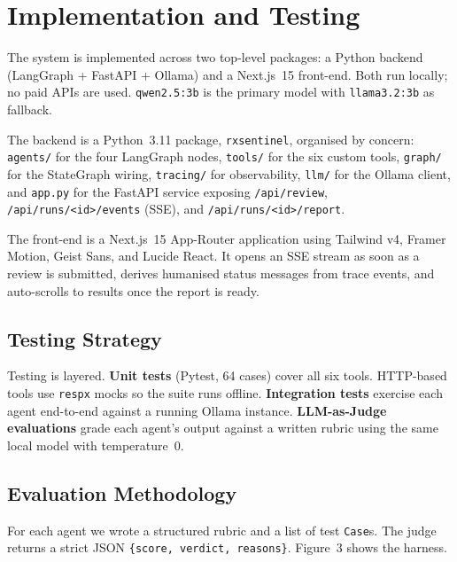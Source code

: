 \documentclass[11pt]{article}
\begin{document}
\section*{Implementation and Testing}\label{impl}

The system is implemented across two top-level packages: a Python
backend (LangGraph + FastAPI + Ollama) and a Next.js~15 front-end.
Both run locally; no paid APIs are used. \texttt{qwen2.5:3b} is the
primary model with \texttt{llama3.2:3b} as fallback.

The backend is a Python~3.11 package, \texttt{rxsentinel}, organised by
concern: \texttt{agents/} for the four LangGraph nodes, \texttt{tools/}
for the six custom tools, \texttt{graph/} for the StateGraph wiring,
\texttt{tracing/} for observability, \texttt{llm/} for the Ollama
client, and \texttt{app.py} for the FastAPI service exposing
\texttt{/api/review}, \texttt{/api/runs/<id>/events} (SSE), and
\texttt{/api/runs/<id>/report}.

The front-end is a Next.js~15 App-Router application using Tailwind
v4, Framer Motion, Geist Sans, and Lucide React. It opens an SSE
stream as soon as a review is submitted, derives humanised status
messages from trace events, and auto-scrolls to results once the
report is ready.

\subsection*{Testing Strategy}

Testing is layered. \textbf{Unit tests} (Pytest, 64 cases) cover all
six tools. HTTP-based tools use \texttt{respx} mocks so the suite
runs offline. \textbf{Integration tests} exercise each agent
end-to-end against a running Ollama instance. \textbf{LLM-as-Judge
evaluations} grade each agent's output against a written rubric using
the same local model with temperature~0.

\subsection*{Evaluation Methodology}

For each agent we wrote a structured rubric and a list of test
\texttt{Case}s. The judge returns a strict JSON
\texttt{\{score, verdict, reasons\}}. Figure~3 shows the harness.
\end{document}
